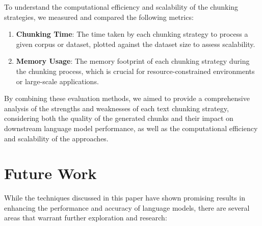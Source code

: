 \documentclass[
  letterpaper,
  DIV=11,
  numbers=noendperiod]{scrartcl}
\begin{document}
To understand the computational efficiency and scalability of the
chunking strategies, we measured and compared the following metrics:

\begin{enumerate}
\def\labelenumi{\arabic{enumi}.}
\item
  \textbf{Chunking Time}: The time taken by each chunking strategy to
  process a given corpus or dataset, plotted against the dataset size to
  assess scalability.
\item
  \textbf{Memory Usage}: The memory footprint of each chunking strategy
  during the chunking process, which is crucial for resource-constrained
  environments or large-scale applications.
\end{enumerate}

By combining these evaluation methods, we aimed to provide a
comprehensive analysis of the strengths and weaknesses of each text
chunking strategy, considering both the quality of the generated chunks
and their impact on downstream language model performance, as well as
the computational efficiency and scalability of the approaches.

\section{Future Work}\label{future-work}

While the techniques discussed in this paper have shown promising
results in enhancing the performance and accuracy of language models,
there are several areas that warrant further exploration and research:
\end{document}
